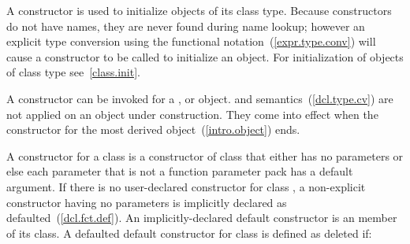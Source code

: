 \pnum
A constructor is used to initialize objects of its class type.
Because constructors do not have names, they are never found during
name lookup; however an explicit type conversion using the functional
notation~(\ref{expr.type.conv}) will cause a constructor to be called to
initialize an object.
\enternote
For initialization of objects of class type see~\ref{class.init}.
\exitnote

\pnum
{}%
%
A constructor can be invoked for a
,
or
object.
%
and
semantics~(\ref{dcl.type.cv}) are not applied on an object under construction.
They come into effect when the constructor for the
most derived object~(\ref{intro.object}) ends.

\pnum
{}%
%
%
A
constructor for a class
is a constructor of class
that either has no parameters or else each parameter that is not a
function parameter pack has a default argument.
%
If there is no user-declared constructor for class
,
a non-explicit constructor having no parameters is implicitly declared
as defaulted~(\ref{dcl.fct.def}).
An implicitly-declared default constructor is an
member of its class.
A defaulted default constructor for class  is defined as deleted if:

